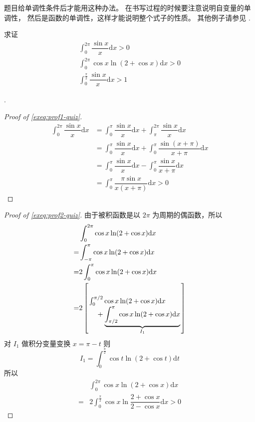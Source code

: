 题目给单调性条件后才能用这种办法。
在书写过程的时候要注意说明自变量的单调性，
然后是函数的单调性，这样才能说明整个式子的性质。
其他例子请参见 \cite[page 119, pdf 130]{we}.

\begin{example}
    求证
    \begin{gather}
        \label{exeq:prof1-quiz} \int_0^{2\pi} \dfrac{\sin x}{x} \mathrm dx > 0 \\
        \label{exeq:prof2-quiz} \int_0^{2\pi} \cos x \ln ( 2+ \cos x) \mathrm dx > 0 \\
        \label{exeq:prof3-quiz} \int_0^{\frac{\pi}{2}} \dfrac{\sin x}{x} \mathrm dx > 1
    \end{gather}

    \cite[question 183]{w660}.

    \begin{proof}[Proof of \ref{exeq:prof1-quiz}]
        \begin{align*}
            \int_0^{2\pi} \dfrac{\sin x}{x} \mathrm dx
            &= \int_0^{\pi} \dfrac{\sin x}{x} \mathrm dx 
            + \int_{\pi}^{2\pi} \dfrac{\sin x}{x} \mathrm dx \\
            &= \int_0^{\pi} \dfrac{\sin x}{x} \mathrm dx 
            + \int_{0}^{\pi} \dfrac{\sin (x + \pi)}{x + \pi} \mathrm dx \\
            &= \int_0^{\pi} \dfrac{\sin x}{x} \mathrm dx 
            - \int_{0}^{\pi} \dfrac{\sin x }{x + \pi} \mathrm dx \\
            &= \int_0^{\pi} \dfrac{\pi \sin x}{x(x + \pi)} \mathrm dx  > 0
        \end{align*}
    \end{proof}

    \begin{proof}[Proof of \ref{exeq:prof2-quiz}]
        由于被积函数是以 $2\pi$ 为周期的偶函数，所以
        \begin{align*}
            &\int_0^{2\pi} \cos x \ln ( 2+ \cos x ) \mathrm dx \\
            =&\int_{-\pi}^{\pi} \cos x \ln ( 2+ \cos x ) \mathrm dx \\
            =&2\int_{0}^{\pi} \cos x \ln ( 2+ \cos x ) \mathrm dx \\
            =&2\left[
                \splitfrac{
                    \int_0^{\pi/2} \cos x \ln ( 2+ \cos x ) \mathrm dx
                }{
                    + 
                    \underbrace{\int_{\pi/2}^{\pi} \cos x \ln ( 2+ \cos x ) \mathrm dx}_{I_1}
                }
            \right]
        \end{align*}
        对 $I_1$ 做积分变量变换 $x = \pi - t$ 则
        \[
            I_1 = \int_0^{\frac{\pi}{2}} \cos t \ln ( 2+ \cos t ) \mathrm dt 
        \]
        所以
        \begin{align*}
            &\int_0^{2\pi } \cos x \ln (2 + \cos x) \mathrm dx \\
            =&2 \int_0^{\frac{\pi}{2}} \cos x \ln \dfrac{2+ \cos x}{2- \cos x} \mathrm dx > 0
        \end{align*}
    \end{proof}


\end{example}
